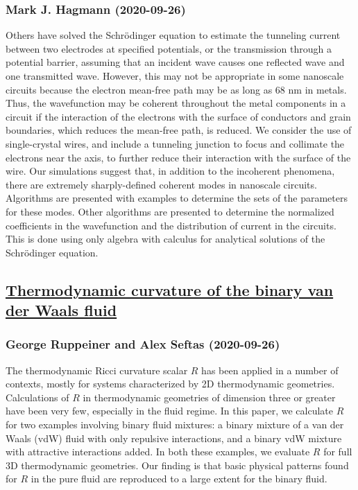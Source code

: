 \subsubsection*{Mark J. Hagmann (2020-09-26)}
Others have solved the Schr\"odinger equation to estimate the tunneling
current between two electrodes at specified potentials, or the transmission
through a potential barrier, assuming that an incident wave causes one
reflected wave and one transmitted wave. However, this may not be appropriate
in some nanoscale circuits because the electron mean-free path may be as long
as 68 nm in metals. Thus, the wavefunction may be coherent throughout the metal
components in a circuit if the interaction of the electrons with the surface of
conductors and grain boundaries, which reduces the mean-free path, is reduced.
We consider the use of single-crystal wires, and include a tunneling junction
to focus and collimate the electrons near the axis, to further reduce their
interaction with the surface of the wire. Our simulations suggest that, in
addition to the incoherent phenomena, there are extremely sharply-defined
coherent modes in nanoscale circuits. Algorithms are presented with examples to
determine the sets of the parameters for these modes. Other algorithms are
presented to determine the normalized coefficients in the wavefunction and the
distribution of current in the circuits. This is done using only algebra with
calculus for analytical solutions of the Schr\"odinger equation.

\subsection*{\href{http://arxiv.org/abs/2009.12668v1}{Thermodynamic curvature of the binary van der Waals fluid}}
\subsubsection*{George Ruppeiner and Alex Seftas (2020-09-26)}
The thermodynamic Ricci curvature scalar $R$ has been applied in a number of
contexts, mostly for systems characterized by 2D thermodynamic geometries.
Calculations of $R$ in thermodynamic geometries of dimension three or greater
have been very few, especially in the fluid regime. In this paper, we calculate
$R$ for two examples involving binary fluid mixtures: a binary mixture of a van
der Waals (vdW) fluid with only repulsive interactions, and a binary vdW
mixture with attractive interactions added. In both these examples, we evaluate
$R$ for full 3D thermodynamic geometries. Our finding is that basic physical
patterns found for $R$ in the pure fluid are reproduced to a large extent for
the binary fluid.

